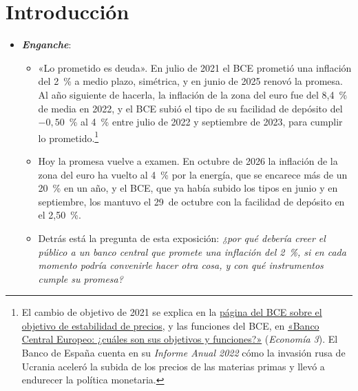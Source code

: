 \documentclass[11pt]{article}
\begin{document}
\tceetitulo

\section*{Introducción}

\begin{itemize}
\item \textbf{\emph{Enganche}}:
  \begin{itemize}
  \item «Lo prometido es deuda». En julio de 2021 el BCE prometió una inflación del 2~\% a medio plazo, simétrica, y en junio de 2025 renovó la promesa\nocite{BCE2021Estrategia,BCE2025Estrategia}. Al año siguiente de hacerla, la inflación de la zona del euro fue del 8,4~\% de media en 2022\nocite{Eurostat2026IAPC}, y el BCE subió el tipo de su facilidad de depósito del $-0{,}50$~\% al 4~\% entre julio de 2022 y septiembre de 2023, para cumplir lo prometido\nocite{BCE2026TiposOficiales}.\footnote{El cambio de objetivo de 2021 se explica en la \href{https://www.ecb.europa.eu/mopo/strategy/strategy-review/html/price-stability-objective.es.html}{página del BCE sobre el objetivo de estabilidad de precios}, y las funciones del BCE, en \href{https://economia3.com/banco-central-europeo/}{«Banco Central Europeo: ¿cuáles son sus objetivos y funciones?»} (\emph{Economía 3}). El Banco de España cuenta en su \emph{Informe Anual 2022} cómo la invasión rusa de Ucrania aceleró la subida de los precios de las materias primas y llevó a endurecer la política monetaria\nocite{BdE2023InformeAnual2022}.}
  \item Hoy la promesa vuelve a examen. En octubre de 2026 la inflación de la zona del euro ha vuelto al 4~\% por la energía, que se encarece más de un 20~\% en un año\nocite{Eurostat2026IAPCoct}, y el BCE, que ya había subido los tipos en junio y en septiembre, los mantuvo el 29~de octubre con la facilidad de depósito en el 2,50~\%\nocite{BCE2026Decisiones}.
  \item Detrás está la pregunta de esta exposición: \emph{¿por qué debería creer el público a un banco central que promete una inflación del 2~\%, si en cada momento podría convenirle hacer otra cosa, y con qué instrumentos cumple su promesa?}
  \end{itemize}


\end{itemize}
\end{document}
